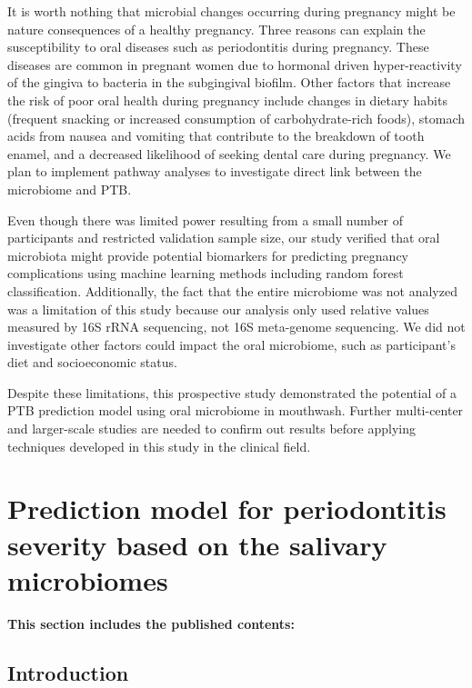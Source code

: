 \documentclass[11pt, a4paper, onecolumn, oneside]{report}
\begin{document}
            It is worth nothing that microbial changes occurring during pregnancy might be nature consequences of a healthy pregnancy. Three reasons can explain the susceptibility to oral diseases such as periodontitis during pregnancy. These diseases are common in pregnant women due to hormonal driven hyper-reactivity of the gingiva to bacteria in the subgingival biofilm. Other factors that increase the risk of poor oral health during pregnancy include changes in dietary habits (frequent snacking or increased consumption of carbohydrate-rich foods), stomach acids from nausea and vomiting that contribute to the breakdown of tooth enamel, and a decreased likelihood of seeking dental care during pregnancy. We plan to implement pathway analyses to investigate direct link between the microbiome and PTB.

            Even though there was limited power resulting from a small number of participants and restricted validation sample size, our study verified that oral microbiota might provide potential biomarkers for predicting pregnancy complications using machine learning methods including random forest classification. Additionally, the fact that the entire microbiome was not analyzed was a limitation of this study because our analysis only used relative values measured by 16S rRNA sequencing, not 16S meta-genome sequencing. We did not investigate other factors could impact the oral microbiome, such as participant’s diet and socioeconomic status.

            Despite these limitations, this prospective study demonstrated the potential of a PTB prediction model using oral microbiome in mouthwash. Further multi-center and larger-scale studies are needed to confirm out results before applying techniques developed in this study in the clinical field.
        \newpage

    \section{Prediction model for periodontitis severity based on the salivary microbiomes}
        \label{section:Periodontitis}

        \textbf{This section includes the published contents:} \\

        \subsection{Introduction}
        \newpage
\end{document}
